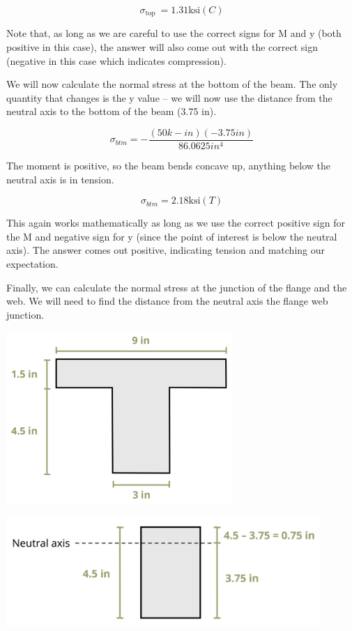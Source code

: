 \documentclass[
  letterpaper,
  DIV=11,
  numbers=noendperiod]{scrreprt}
\begin{document}
\begin{tcolorbox}
\[
\sigma_{\text {top }}=1.31 \mathrm{ksi}(C)
\]

Note that, as long as we are careful to use the correct signs for M and
y (both positive in this case), the answer will also come out with the
correct sign (negative in this case which indicates compression).

We will now calculate the normal stress at the bottom of the beam. The
only quantity that changes is the y value -- we will now use the
distance from the neutral axis to the bottom of the beam (3.75 in).

\[
\sigma_{b t m}=-\frac{(50 k-i n)(-3.75 i n)}{86.0625 i n^4}
\]

The moment is positive, so the beam bends concave up, anything below the
neutral axis is in tension.

\[
\sigma_{b t m}=2.18 \mathrm{ksi}(T)
\]

This again works mathematically as long as we use the correct positive
sign for the M and negative sign for y (since the point of interest is
below the neutral axis). The answer comes out positive, indicating
tension and matching our expectation.

Finally, we can calculate the normal stress at the junction of the
flange and the web. We will need to find the distance from the neutral
axis the flange web junction.

\begin{center}
\includegraphics[width=3.375in,height=\textheight]{images/CH9 PNGs/Example 9.1 part 5.png}
\end{center}

\begin{center}
\includegraphics[width=4.67708in,height=\textheight]{images/CH9 PNGs/Example 9.1 part 6.png}
\end{center}


\end{tcolorbox}
\end{document}
